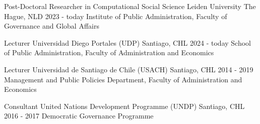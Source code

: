 






\begin{cventries}
\cventry
{Post-Doctoral Researcher in Computational Social Science} 
{Leiden University} 
{The Hague, NLD} 
{2023 - today}
{Institute of Public Administration, Faculty of Governance and Global Affairs} \vspace{1.5mm}

\cventry
{Lecturer} 
{Universidad Diego Portales (UDP)} 
{Santiago, CHL} 
{2024 - today}
{School of Public Administration, Faculty of Administration and Economics} \vspace{1.5mm}

\cventry
{Lecturer} 
{Universidad de Santiago de Chile (USACH)} 
{Santiago, CHL} 
{2014 - 2019}
{Management and Public Policies Department, Faculty of Administration and Economics} \vspace{1.5mm}


\cventry
{Consultant} 
{United Nations Development Programme (UNDP)} 
{Santiago, CHL} 
{2016 - 2017}
{Democratic Governance Programme} %

\end{cventries}
\pagebreak